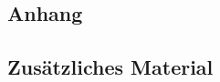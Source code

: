 \begin{appendices}

    \chapter{Anhang}
    \label{appendix}

    \section{Zusätzliches Material}

\end{appendices}
